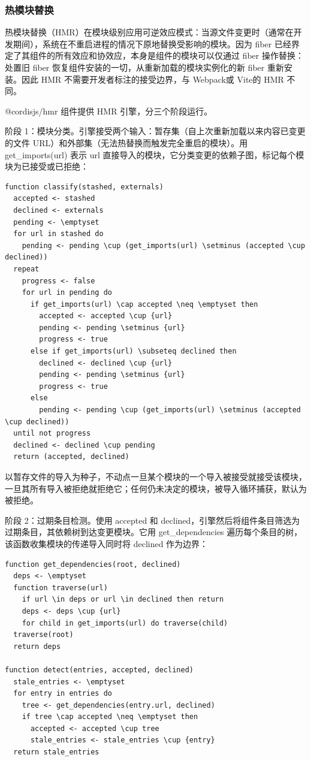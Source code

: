 \subsubsection{热模块替换}\label{sec:5.2.2}

热模块替换（HMR）在模块级别应用可逆效应模式：当源文件变更时（通常在开发期间），系统在不重启进程的情况下原地替换受影响的模块。因为 fiber 已经界定了其组件的所有效应和协效应，本身是组件的模块可以仅通过 fiber 操作替换：处置旧 fiber 恢复组件安装的一切，从重新加载的模块实例化的新 fiber 重新安装。因此 HMR 不需要开发者标注的接受边界，与 Webpack\cite{ref46}或 Vite\cite{ref47}的 HMR 不同。

@cordisjs/hmr 组件提供 HMR 引擎，分三个阶段运行。

阶段 1：模块分类。引擎接受两个输入：暂存集（自上次重新加载以来内容已变更的文件 URL）和外部集（无法热替换而触发完全重启的模块）。用 get\_imports(url) 表示 url 直接导入的模块，它分类变更的依赖子图，标记每个模块为已接受或已拒绝：

\begin{lstlisting}[caption={模块分类}]
function classify(stashed, externals)
  accepted <- stashed
  declined <- externals
  pending <- \emptyset
  for url in stashed do
    pending <- pending \cup (get_imports(url) \setminus (accepted \cup declined))
  repeat
    progress <- false
    for url in pending do
      if get_imports(url) \cap accepted \neq \emptyset then
        accepted <- accepted \cup {url}
        pending <- pending \setminus {url}
        progress <- true
      else if get_imports(url) \subseteq declined then
        declined <- declined \cup {url}
        pending <- pending \setminus {url}
        progress <- true
      else
        pending <- pending \cup (get_imports(url) \setminus (accepted \cup declined))
  until not progress
  declined <- declined \cup pending
  return (accepted, declined)
\end{lstlisting}

以暂存文件的导入为种子，不动点一旦某个模块的一个导入被接受就接受该模块，一旦其所有导入被拒绝就拒绝它；任何仍未决定的模块，被导入循环捕获，默认为被拒绝。

阶段 2：过期条目检测。使用 accepted 和 declined，引擎然后将组件条目筛选为过期条目，其依赖树到达变更模块。它用 get\_dependencies 遍历每个条目的树，该函数收集模块的传递导入同时将 declined 作为边界：

\begin{lstlisting}[caption={过期条目检测}]
function get_dependencies(root, declined)
  deps <- \emptyset
  function traverse(url)
    if url \in deps or url \in declined then return
    deps <- deps \cup {url}
    for child in get_imports(url) do traverse(child)
  traverse(root)
  return deps

function detect(entries, accepted, declined)
  stale_entries <- \emptyset
  for entry in entries do
    tree <- get_dependencies(entry.url, declined)
    if tree \cap accepted \neq \emptyset then
      accepted <- accepted \cup tree
      stale_entries <- stale_entries \cup {entry}
  return stale_entries
\end{lstlisting}

